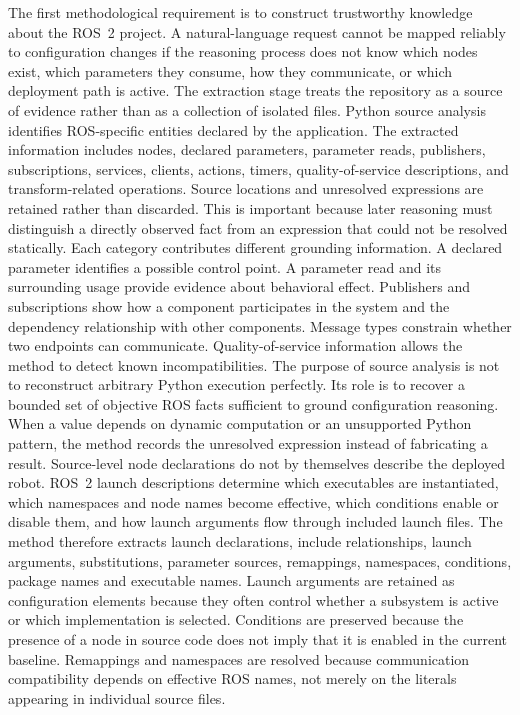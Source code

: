 The first methodological requirement is to construct trustworthy knowledge about the ROS~2 project. A natural-language request cannot be mapped reliably to configuration changes if the reasoning process does not know which nodes exist, which parameters they consume, how they communicate, or which deployment path is active. The extraction stage treats the repository as a source of evidence rather than as a collection of isolated files.
Python source analysis identifies ROS-specific entities declared by the application. The extracted information includes nodes, declared parameters, parameter reads, publishers, subscriptions, services, clients, actions, timers, quality-of-service descriptions, and transform-related operations. Source locations and unresolved expressions are retained rather than discarded. This is important because later reasoning must distinguish a directly observed fact from an expression that could not be resolved statically.
Each category contributes different grounding information. A declared parameter identifies a possible control point. A parameter read and its surrounding usage provide evidence about behavioral effect. Publishers and subscriptions show how a component participates in the system and the dependency relationship with other components. Message types constrain whether two endpoints can communicate. Quality-of-service information allows the method to detect known incompatibilities.
The purpose of source analysis is not to reconstruct arbitrary Python execution perfectly. Its role is to recover a bounded set of objective ROS facts sufficient to ground configuration reasoning. When a value depends on dynamic computation or an unsupported Python pattern, the method records the unresolved expression instead of fabricating a result.
Source-level node declarations do not by themselves describe the deployed robot. ROS~2 launch descriptions determine which executables are instantiated, which namespaces and node names become effective, which conditions enable or disable them, and how launch arguments flow through included launch files. The method therefore extracts launch declarations, include relationships, launch arguments, substitutions, parameter sources, remappings, namespaces, conditions, package names and executable names.
Launch arguments are retained as configuration elements because they often control whether a subsystem is active or which implementation is selected. Conditions are preserved because the presence of a node in source code does not imply that it is enabled in the current baseline. Remappings and namespaces are resolved because communication compatibility depends on effective ROS names, not merely on the literals appearing in individual source files.
